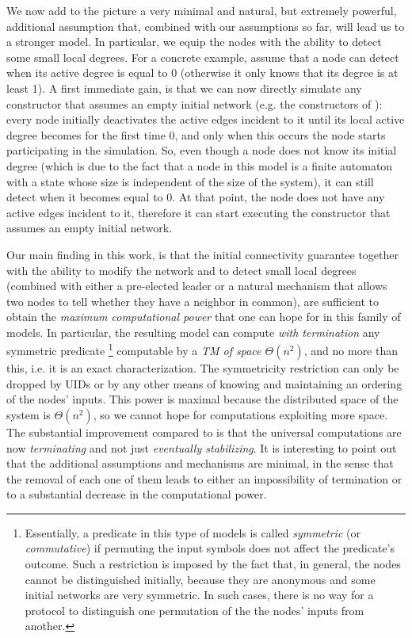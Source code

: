 \documentclass[preprint]{elsarticle}
\begin{document}
We now add to the picture a very minimal and natural, but extremely powerful, additional assumption that, combined with our assumptions so far, will lead us to a stronger model. In particular, we equip the nodes with the ability to detect some small local degrees. For a concrete example, assume that a node can detect when its active degree is equal to 0 (otherwise it only knows that its degree is at least 1). A first immediate gain, is that we can now directly simulate any constructor that assumes an empty initial network (e.g. the constructors of \cite{MS14}): every node initially deactivates the active edges incident to it until its local active degree becomes for the first time 0, and only when this occurs the node starts participating in the simulation. So, even though a node does not know its initial degree (which is due to the fact that a node in this model is a finite automaton with a state whose size is independent of the size of the system), it can still detect when it becomes equal to 0. At that point, the node does not have any active edges incident to it, therefore it can start executing the constructor that assumes an empty initial network.

Our main finding in this work, is that the initial connectivity guarantee together with the ability to modify the network and to detect small local degrees (combined with either a pre-elected leader or a natural mechanism that allows two nodes to tell whether they have a neighbor in common), are sufficient to obtain the \emph{maximum computational power} that one can hope for in this family of models. In particular, the resulting model can compute \emph{with termination} any symmetric predicate \footnote{Essentially, a predicate in this type of models is called \emph{symmetric} (or \emph{commutative}) if permuting the input symbols does not affect the predicate's outcome. Such a restriction is imposed by the fact that, in general, the nodes cannot be distinguished initially, because they are anonymous and some initial networks are very symmetric. In such cases, there is no way for a protocol to distinguish one permutation of the the nodes' inputs from another.} computable by a \emph{TM of space $\Theta(n^2)$}, and no more than this, i.e. it is an exact characterization. The symmetricity restriction can only be dropped by UIDs or by any other means of knowing and maintaining an ordering of the nodes' inputs. This power is maximal because the distributed space of the system is $\Theta(n^2)$, so we cannot hope for computations exploiting more space. The substantial improvement compared to \cite{MS14,MCS11-2} is that the universal computations are now \emph{terminating} and not just \emph{eventually stabilizing}. It is interesting to point out that the additional assumptions and mechanisms are minimal, in the sense that the removal of each one of them leads to either an impossibility of termination or to a substantial decrease in the computational power.
\end{document}
